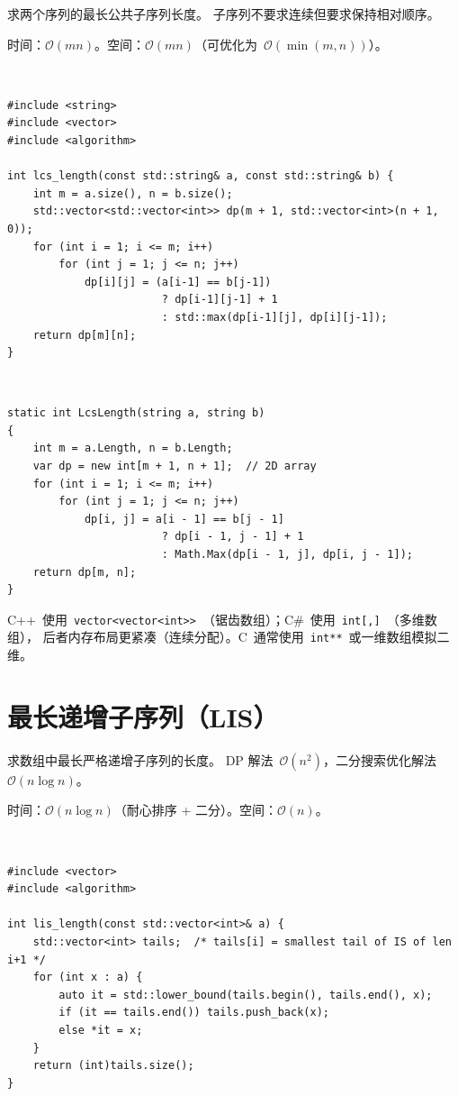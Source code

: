 \documentclass[12pt,a4paper,fontset=fandol]{ctexbook}
\newcommand{\cpplabel}{%
  \noindent\begin{tcolorbox}[sharp corners,colback=cppheadbg,colframe=cppheadbg,
    left=6pt,right=6pt,top=2pt,bottom=2pt,boxrule=0pt]
  \textcolor{white}{\small\bfseries\sffamily C++}\end{tcolorbox}%
}
\newcommand{\csharplabel}{%
  \noindent\begin{tcolorbox}[sharp corners,colback=csharpheadbg,colframe=csharpheadbg,
    left=6pt,right=6pt,top=2pt,bottom=2pt,boxrule=0pt]
  \textcolor{white}{\small\bfseries\sffamily C\#}\end{tcolorbox}%
}
\newcommand{\bigO}[1]{\mathcal{O}(#1)}
\newcommand{\Tp}[1]{\texttt{#1}}
\begin{document}
求两个序列的最长公共子序列长度。
子序列不要求连续但要求保持相对顺序。

\begin{complexitybox}
  时间：$\bigO{mn}$。空间：$\bigO{mn}$（可优化为~$\bigO{\min(m,n)}$）。
\end{complexitybox}

\cpplabel
\begin{lstlisting}[style=cppstyle]
#include <string>
#include <vector>
#include <algorithm>

int lcs_length(const std::string& a, const std::string& b) {
    int m = a.size(), n = b.size();
    std::vector<std::vector<int>> dp(m + 1, std::vector<int>(n + 1, 0));
    for (int i = 1; i <= m; i++)
        for (int j = 1; j <= n; j++)
            dp[i][j] = (a[i-1] == b[j-1])
                        ? dp[i-1][j-1] + 1
                        : std::max(dp[i-1][j], dp[i][j-1]);
    return dp[m][n];
}
\end{lstlisting}

\csharplabel
\begin{lstlisting}[style=csharpstyle]
static int LcsLength(string a, string b)
{
    int m = a.Length, n = b.Length;
    var dp = new int[m + 1, n + 1];  // 2D array
    for (int i = 1; i <= m; i++)
        for (int j = 1; j <= n; j++)
            dp[i, j] = a[i - 1] == b[j - 1]
                        ? dp[i - 1, j - 1] + 1
                        : Math.Max(dp[i - 1, j], dp[i, j - 1]);
    return dp[m, n];
}
\end{lstlisting}

\begin{compare}
C++~使用~\Tp{vector<vector<int>>}~（锯齿数组）；C\#~使用~\texttt{int[,]}~（多维数组），
后者内存布局更紧凑（连续分配）。C~通常使用~\texttt{int**}~或一维数组模拟二维。
\end{compare}

\chapter{最长递增子序列（LIS）}

求数组中最长严格递增子序列的长度。
DP 解法~$\bigO{n^2}$，二分搜索优化解法~$\bigO{n \log n}$。

\begin{complexitybox}
  时间：$\bigO{n \log n}$（耐心排序 + 二分）。空间：$\bigO{n}$。
\end{complexitybox}

\cpplabel
\begin{lstlisting}[style=cppstyle]
#include <vector>
#include <algorithm>

int lis_length(const std::vector<int>& a) {
    std::vector<int> tails;  /* tails[i] = smallest tail of IS of len i+1 */
    for (int x : a) {
        auto it = std::lower_bound(tails.begin(), tails.end(), x);
        if (it == tails.end()) tails.push_back(x);
        else *it = x;
    }
    return (int)tails.size();
}
\end{lstlisting}
\end{document}
